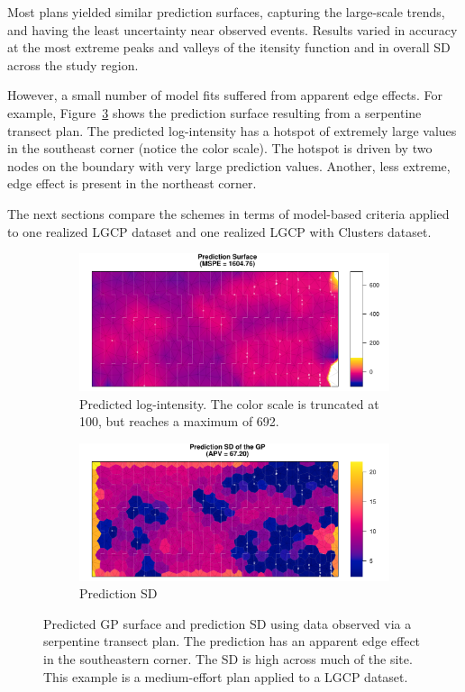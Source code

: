 \documentclass[review]{elsarticle}
\begin{document}
Most plans yielded similar prediction surfaces, capturing the large-scale
trends, and having the least uncertainty near observed events. Results varied
in accuracy at the most extreme peaks and valleys of the itensity function and
in overall SD across the study region.

However, a small number of model fits suffered from apparent edge effects.
For example, Figure~\ref{serp000148} shows the prediction surface resulting
from a serpentine transect plan. The predicted log-intensity has a hotspot of
extremely large values in the southeast corner (notice the color scale). The
hotspot is driven by two nodes on the boundary with very large prediction
values. Another, less extreme, edge effect is present in the northeast corner.

The next sections compare the schemes in terms of model-based criteria applied
to one realized LGCP dataset and one realized LGCP with Clusters dataset.

\begin{figure}

\begin{subfigure}{5in}
\includegraphics[width=5in]{../graphics/lambda-Serp000148-LGCP000004.pdf}
\caption{Predicted log-intensity. The color scale is truncated at 100, but
reaches a maximum of 692.}
\label{lambdaserp000148lgcp}
\end{subfigure}

\begin{subfigure}{5in}
\includegraphics[width=5in]{../graphics/lambdaSD-Serp000148-LGCP000004.pdf}
\caption{Prediction SD}
\label{sdserp000148lgcp}
\end{subfigure}

\caption{Predicted GP surface and prediction SD using data observed via a
serpentine transect plan. The prediction has an apparent edge effect in the
southeastern corner. The SD is high across much of the site. This example is
a medium-effort plan applied to a LGCP dataset.}
\label{serp000148}
\end{figure}
\end{document}
